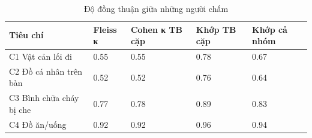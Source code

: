 \begin{table}[t]
\centering
\caption{Độ đồng thuận giữa những người chấm}
\footnotesize
\begin{tabular}{lllll}
\hline
Tiêu chí & Fleiss κ & Cohen κ TB cặp & Khớp TB cặp & Khớp cả nhóm \\
\hline
C1 Vật cản lối đi & 0.55 & 0.55 & 0.78 & 0.67 \\
C2 Đồ cá nhân trên bàn & 0.52 & 0.52 & 0.76 & 0.64 \\
C3 Bình chữa cháy bị che & 0.77 & 0.78 & 0.89 & 0.83 \\
C4 Đồ ăn/uống & 0.92 & 0.92 & 0.96 & 0.94 \\
\hline
\end{tabular}
\end{table}